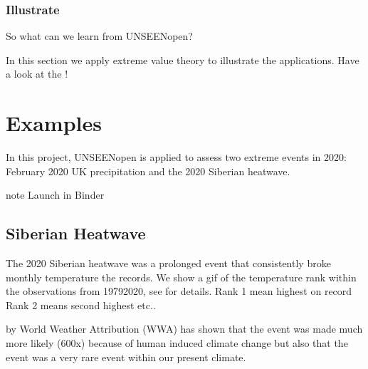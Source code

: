 \documentclass[letterpaper,10pt,english]{sphinxmanual}
\let\sphinxpxdimen\pdfpxdimen\else\newdimen\sphinxpxdimen
\begin{document}
\subsubsection{Illustrate}
\label{\detokenize{Notebooks/Workflow:Illustrate}}
So what can we learn from UNSEEN\sphinxhyphen{}open?

In this section we apply extreme value theory to illustrate the applications. Have a look at the !


\section{Examples}
\label{\detokenize{Notebooks/Examples:examples}}\label{\detokenize{Notebooks/Examples::doc}}
In this project, UNSEEN\sphinxhyphen{}open is applied to assess two extreme events in 2020: February 2020 UK precipitation and the 2020 Siberian heatwave.

\begin{sphinxadmonition}{note}{}\unskip
Launch in Binder 


\end{sphinxadmonition}


\subsection{Siberian Heatwave}
\label{\detokenize{Notebooks/examples/Siberian_Heatwave:Siberian-Heatwave}}\label{\detokenize{Notebooks/examples/Siberian_Heatwave::doc}}
The 2020 Siberian heatwave was a prolonged event that consistently broke monthly temperature the records. We show a gif of the temperature rank within the observations from 1979\sphinxhyphen{}2020, see {\hyperref[\detokenize{Notebooks/Global_monthly_temperature_records_ERA5::doc}]{}} for details. \sphinxhyphen{} Rank 1 mean highest on record \sphinxhyphen{} Rank 2 means second highest \sphinxhyphen{} etc..

\sphinxincludegraphics[width=648\sphinxpxdimen,height=324\sphinxpxdimen]{{Siberia_Animation_011}.gif}

 by World Weather Attribution (WWA) has shown that the event was made much more likely (600x) because of human induced climate change but also that the event was a very rare event within our present climate.
\end{document}
